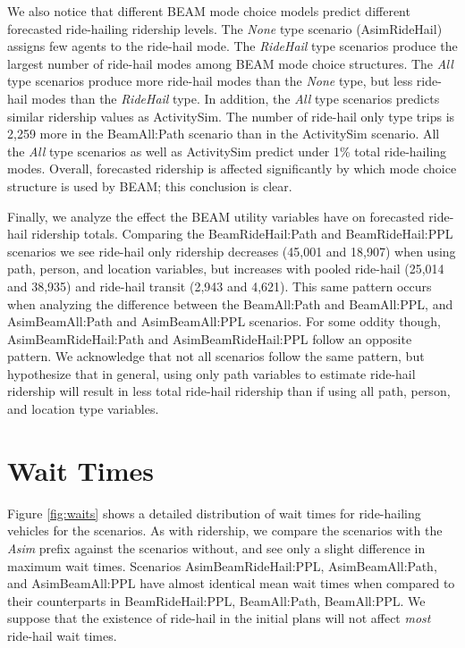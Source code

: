 \documentclass[fancy, masters]{byuthesis}
\begin{document}
We also notice that different BEAM mode choice models predict different forecasted ride-hailing ridership levels. The \emph{None} type scenario (AsimRideHail) assigns few agents to the ride-hail mode. The \emph{RideHail} type scenarios produce the largest number of ride-hail modes among BEAM mode choice structures. The \emph{All} type scenarios produce more ride-hail modes than the \emph{None} type, but less ride-hail modes than the \emph{RideHail} type. In addition, the \emph{All} type scenarios predicts similar ridership values as ActivitySim. The number of ride-hail only type trips is 2,259 more in the BeamAll:Path scenario than in the ActivitySim scenario. All the \emph{All} type scenarios as well as ActivitySim predict under 1\% total ride-hailing modes. Overall, forecasted ridership is affected significantly by which mode choice structure is used by BEAM; this conclusion is clear.

Finally, we analyze the effect the BEAM utility variables have on forecasted ride-hail ridership totals. Comparing the BeamRideHail:Path and BeamRideHail:PPL scenarios we see ride-hail only ridership decreases (45,001 and 18,907) when using path, person, and location variables, but increases with pooled ride-hail (25,014 and 38,935) and ride-hail transit (2,943 and 4,621). This same pattern occurs when analyzing the difference between the BeamAll:Path and BeamAll:PPL, and AsimBeamAll:Path and AsimBeamAll:PPL scenarios. For some oddity though, AsimBeamRideHail:Path and AsimBeamRideHail:PPL follow an opposite pattern. We acknowledge that not all scenarios follow the same pattern, but hypothesize that in general, using only path variables to estimate ride-hail ridership will result in less total ride-hail ridership than if using all path, person, and location type variables.

\hypertarget{res-waits}{%
\section{Wait Times}\label{res-waits}}

Figure \ref{fig:waits} shows a detailed distribution of wait times for ride-hailing vehicles for the scenarios. As with ridership, we compare the scenarios with the \emph{Asim} prefix against the scenarios without, and see only a slight difference in maximum wait times. Scenarios AsimBeamRideHail:PPL, AsimBeamAll:Path, and AsimBeamAll:PPL have almost identical mean wait times when compared to their counterparts in BeamRideHail:PPL, BeamAll:Path, BeamAll:PPL. We suppose that the existence of ride-hail in the initial plans will not affect \emph{most} ride-hail wait times.
\end{document}
